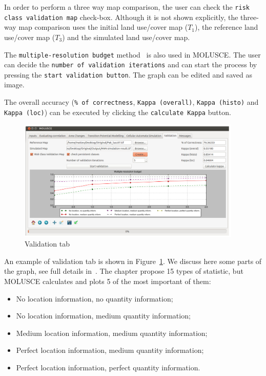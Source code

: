 \documentclass{report}
\begin{document}
In order to perform a three way map comparison, the user can check the \verb+risk class validation map+
check-box. Although it is not shown explicitly, the three-way map comparison uses the initial land
use/cover map ($T_1$), the reference land use/cover map ($T_3$) and the simulated land use/cover map.

The \verb+multiple-resolution budget+ method~\cite[Chapter~17]{pontius2004maps_aggreament} is also used in MOLUSCE. The user can decide the 
\verb+number of validation iterations+ and can start the process by pressing the \verb+start validation button+.
The graph can be edited and saved as image.

The overall accuracy (\verb+% of correctness+, \verb+Kappa (overall)+, \verb+Kappa (histo)+ and \verb+Kappa (loc)+) can be
executed by clicking the \verb+calculate Kappa+ button.

\begin{figure}[h!]
\centering
\includegraphics[width=0.95\textwidth]{img/validation_tab.png}
\caption{Validation tab}
\label{fig:validation_tab}
\end{figure}

An example of validation tab is shown in Figure~\ref{fig:validation_tab}.
We discuss here some parts of the graph, see full details in~\cite[Chapter~17]{pontius2004maps_aggreament}.
The chapter propose 15 types of statistic, but MOLUSCE calculates and plots 5 of the most important of them:
\begin{itemize}
  \item No location information, no quantity information;
  \item No location information, medium quantity information;
  \item Medium location information, medium quantity information;
  \item Perfect location information, medium quantity information;
  \item Perfect location information, perfect quantity information.
\end{itemize}
\end{document}
